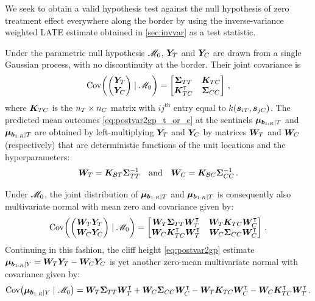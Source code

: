 \begin{appendices}
We seek to obtain a valid hypothesis test against the null hypothesis of zero treatment effect everywhere along the border by using the inverse-variance weighted LATE estimate obtained in \autoref{sec:invvar} as a test statistic.

Under the parametric null hypothesis \(\mathscr{M}_0\), \(\bm{Y}_{T}\) and \(\bm{Y}_{C}\) are drawn from a single Gaussian process, with no discontinuity at the border.
Their joint covariance is
\begin{equation}
\cov \del{\begin{pmatrix}\yt \\ \yc\end{pmatrix} \mid \modnull } 
    = \begin{bmatrix}
        \STT & \KTC \\
        \KTC \trans & \SCC
    \end{bmatrix}\,,
\end{equation}
where \(\bm{K}_{T C}\) is the \(n_T \times n_C\) matrix with \(ij^{\mathrm{th}}\) entry equal to \(k\del{\svec_{i\treat},\svec_{j\ctrol}}\).
The predicted mean outcomes \autoref{eq:postvar2gp_t_or_c} at the sentinels \(\bm{\mu}_{\bm{b}_{1:R} \mid T}\) and \(\bm{\mu}_{\bm{b}_{1:R} \mid T}\) are obtained by left-multiplying \(\bm{Y}_{T}\) and \(\bm{Y}_{C}\) by matrices \(\bm{W}_{T}\) and \(\bm{W}_{C}\) (respectively) that are deterministic functions of the unit locations and the hyperparameters:
\begin{equation}
    \bm{W}_{T} = \bm{K}_{\mathcal{B} T} \bm{\Sigma}_{T T}^{-1} \quad\text{and}\quad
    \bm{W}_{C} = \bm{K}_{\mathcal{B} C} \bm{\Sigma}_{C C}^{-1}\,.
\end{equation}

Under \(\mathscr{M}_0\), the joint distribution of \(\bm{\mu}_{\bm{b}_{1:R} \mid T}\) and \(\bm{\mu}_{\bm{b}_{1:R} \mid T}\) is consequently also multivariate normal with mean zero and covariance given by:
\begin{equation}
\cov \del{\begin{pmatrix}\WT \yt \\ \WC \yc \end{pmatrix} \mid \modnull } = \begin{bmatrix}
    \WT \STT       \WT\trans & \WT \KTC \WC\trans \\
    \WC \KTC\trans \WT\trans & \WC \SCC \WC\trans
\end{bmatrix}\,.
\end{equation}
Continuing in this fashion, the cliff height \autoref{eq:postvar2gp} estimate 
\(\bm{\mu}_{\bm{b}_{1:R} \mid Y} = \bm{W}_{T} \bm{Y}_{T} - \bm{W}_{C} \bm{Y}_{C}\)
is yet another zero-mean multivariate normal with covariance given by:
\begin{equation}
        \cov \del{\muvec_{\sentinels \mid Y} \mid \modnull} 
        = \WT \STT \WT\trans + \WC \SCC \WC\trans - \WT \KTC \WC\trans -  \WC\KTC\trans\WT\trans \,.
\end{equation}


\end{appendices}
